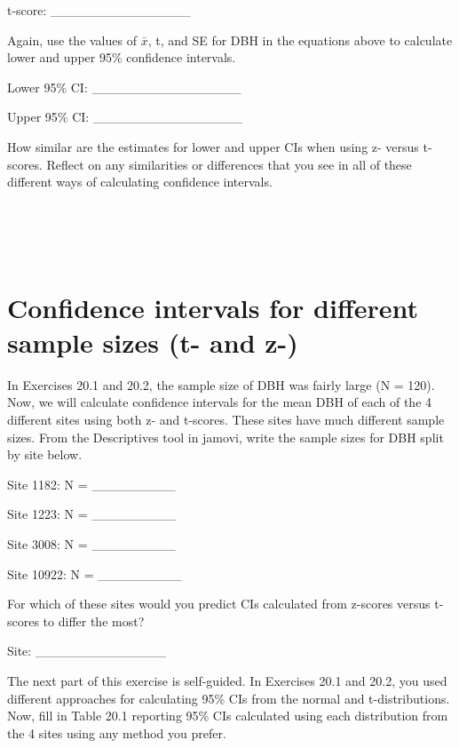 \documentclass[
  openany]{krantz}
\begin{document}
t-score: \_\_\_\_\_\_\_\_\_\_\_\_\_\_\_

Again, use the values of \(\bar{x}\), t, and SE for DBH in the equations above to calculate lower and upper 95\% confidence intervals.

Lower 95\% CI: \_\_\_\_\_\_\_\_\_\_\_\_\_\_\_\_

Upper 95\% CI: \_\_\_\_\_\_\_\_\_\_\_\_\_\_\_\_

How similar are the estimates for lower and upper CIs when using z- versus t-scores.
Reflect on any similarities or differences that you see in all of these different ways of calculating confidence intervals.

\begin{verbatim}




\end{verbatim}

\hypertarget{confidence-intervals-for-different-sample-sizes-t--and-z-}{%
\section{Confidence intervals for different sample sizes (t- and z-)}\label{confidence-intervals-for-different-sample-sizes-t--and-z-}}

In Exercises 20.1 and 20.2, the sample size of DBH was fairly large (N = 120).
Now, we will calculate confidence intervals for the mean DBH of each of the 4 different sites using both z- and t-scores.
These sites have much different sample sizes.
From the Descriptives tool in jamovi, write the sample sizes for DBH split by site below.

Site 1182: N = \_\_\_\_\_\_\_\_\_

Site 1223: N = \_\_\_\_\_\_\_\_\_

Site 3008: N = \_\_\_\_\_\_\_\_\_

Site 10922: N = \_\_\_\_\_\_\_\_\_

For which of these sites would you predict CIs calculated from z-scores versus t-scores to differ the most?

Site: \_\_\_\_\_\_\_\_\_\_\_\_\_\_

The next part of this exercise is self-guided.
In Exercises 20.1 and 20.2, you used different approaches for calculating 95\% CIs from the normal and t-distributions.
Now, fill in Table 20.1 reporting 95\% CIs calculated using each distribution from the 4 sites using any method you prefer.
\end{document}
